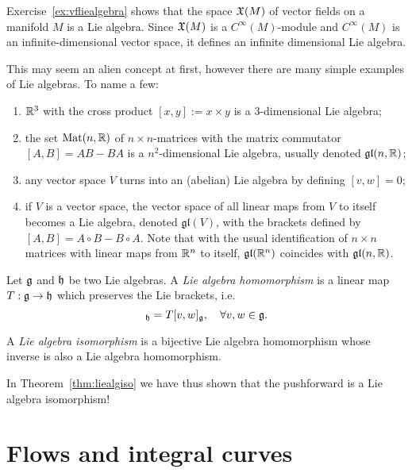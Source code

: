 \begin{example}
	Exercise~\ref{ex:vfliealgebra} shows that the space $\mathfrak{X}(M)$ of vector fields on a manifold $M$ is a Lie algebra.
	Since $\mathfrak{X}(M)$ is a $C^\infty(M)$-module and $C^\infty(M)$ is an infinite-dimensional vector space, it defines an infinite dimensional Lie algebra.

	This may seem an alien concept at first, however there are many simple examples of Lie algebras. To name a few:
	\begin{enumerate}
		\item $\mathbb{R}^3$ with the cross product $[x,y]:=x\times y$ is a $3$-dimensional Lie algebra;
		\item the set $\mathrm{Mat}(n, \mathbb{R})$ of $n\times n$-matrices with the matrix commutator $[A,B] = AB-BA$ is a $n^2$-dimensional Lie algebra, usually denoted $\mathfrak{gl}(n, \mathbb{R})$;
		\item any vector space $V$ turns into an (abelian) Lie algebra by defining $[v,w]=0$;
		\item if $V$ is a vector space, the vector space of all linear maps from $V$ to itself becomes a Lie algebra, denoted $\mathfrak{gl}(V)$, with the brackets defined by $[A,B] = A\circ B-B\circ A$. Note that with the usual identification of $n\times n$ matrices with linear maps from $\mathbb{R}^n$ to itself, $\mathfrak{gl}(\mathbb{R}^n)$ coincides with $\mathfrak{gl}(n, \mathbb{R})$.
	\end{enumerate}
\end{example}

\begin{definition}\label{def:LAmorphism}
	Let $\mathfrak{g}$ and $\mathfrak{h}$ be two Lie algebras.
	A \emph{Lie algebra homomorphism} is a linear map $T:\mathfrak{g}\to\mathfrak{h}$ which preserves the Lie brackets, i.e.
	\begin{equation}
		[Tv, Tw]_\fh = T[v,w]_\fg, \quad \forall v,w\in\fg.
	\end{equation}

	A \emph{Lie algebra isomorphism} is a bijective Lie algebra homomorphism whose inverse is also a Lie algebra homomorphism.
\end{definition}

In Theorem~\ref{thm:liealgiso} we have thus shown that the pushforward is a Lie algebra isomorphism!

\section{Flows and integral curves}

